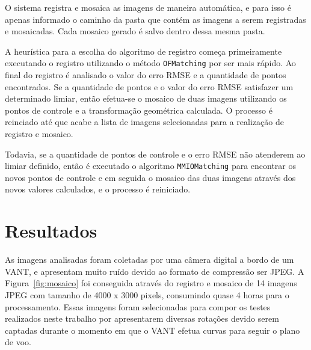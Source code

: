 \documentclass[9pt, a4paper, nofonttune, journal]{IEEEtran}
\begin{document}
O sistema registra e mosaica as imagens de maneira automática, e para isso é apenas informado o caminho da pasta que contém as imagens a serem registradas e mosaicadas. Cada mosaico gerado é salvo dentro dessa mesma pasta.

A heurística para a escolha do algoritmo de registro começa primeiramente executando o registro utilizando o método \texttt{OFMatching} por ser mais rápido. Ao final do registro é analisado o valor do erro RMSE e a quantidade de pontos encontrados. Se a quantidade de pontos e o valor do erro RMSE satisfazer um determinado limiar, então efetua-se o mosaico de duas imagens utilizando os pontos de controle e a transformação geométrica calculada. O processo é reinciado até que acabe a lista de imagens selecionadas para a realização de registro e mosaico.

Todavia, se a quantidade de pontos de controle e o erro RMSE não atenderem ao limiar definido, então é executado o algoritmo \texttt{MMIOMatching} para encontrar os novos pontos de controle e em seguida o mosaico das duas imagens através dos novos valores calculados, e o processo é reiniciado.

\section{Resultados}

As imagens analisadas foram coletadas por uma câmera digital a bordo de um VANT, e apresentam muito ruído devido ao formato de compressão ser JPEG. A Figura~\ref{fig:mosaico} foi conseguida através do registro e mosaico de 14 imagens JPEG com tamanho de 4000 x 3000 pixels, consumindo quase 4 horas para o processamento. Essas imagens foram selecionadas para compor os testes realizados neste trabalho por apresentarem diversas rotações devido serem captadas durante o momento em que o VANT efetua curvas para seguir o plano de voo.
\end{document}
